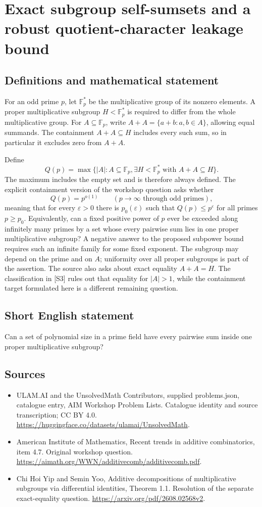 \documentclass[11pt,a4paper]{article}
\begin{document}
\section*{Exact subgroup self-sumsets and a robust quotient-character leakage bound}\label{statement}

\subsection{Definitions and mathematical statement}
For an odd prime $p$, let $\mathbb F_p^*$ be the multiplicative group of its nonzero elements.
A proper multiplicative subgroup $H<\mathbb F_p^*$ is required to differ from the whole multiplicative group.
For $A\subseteq\mathbb F_p$, write
$A+A=\{a+b:a,b\in A\}$, allowing equal summands.
The containment $A+A\subseteq H$ includes every such sum, so in particular it excludes zero from $A+A$.

Define
\[
 Q(p)=\max\{|A|:A\subseteq\mathbb F_p,
       \exists H<\mathbb F_p^*\text{ with }A+A\subseteq H\}.
\]
The maximum includes the empty set and is therefore always defined.
The explicit containment version of the workshop question asks whether
\[
 Q(p)=p^{o(1)}\qquad(p\to\infty\text{ through odd primes}),
\]
meaning that for every $\varepsilon>0$ there is $p_0(\varepsilon)$ such that $Q(p)\leq p^\varepsilon$ for all primes $p\geq p_0$.
Equivalently, can a fixed positive power of $p$ ever be exceeded along infinitely many primes by a set whose every pairwise sum lies in one proper multiplicative subgroup?
A negative answer to the proposed subpower bound requires such an infinite family for some fixed exponent.
The subgroup may depend on the prime and on $A$; uniformity over all proper subgroups is part of the assertion.
The source also asks about exact equality $A+A=H$. The classification in [S3] rules out that equality for $|A|>1$, while the containment target formulated here is a different remaining question.
\subsection{Short English statement}
Can a set of polynomial size in a prime field have every pairwise sum inside one proper multiplicative subgroup?
\subsection{Sources}
\begin{itemize}
\item[S1] ULAM.AI and the UnsolvedMath Contributors, supplied problems.json, catalogue entry, AIM Workshop Problem Lists. Catalogue identity and source transcription; CC BY 4.0.
\url{https://huggingface.co/datasets/ulamai/UnsolvedMath}.
\item[S2] American Institute of Mathematics, Recent trends in additive combinatorics, item 4.7. Original workshop question.
\url{https://aimath.org/WWN/additivecomb/additivecomb.pdf}.
\item[S3] Chi Hoi Yip and Semin Yoo, Additive decompositions of multiplicative subgroups via differential identities, Theorem 1.1. Resolution of the separate exact-equality question.
\url{https://arxiv.org/pdf/2608.02568v2}.
\end{itemize}
\end{document}
